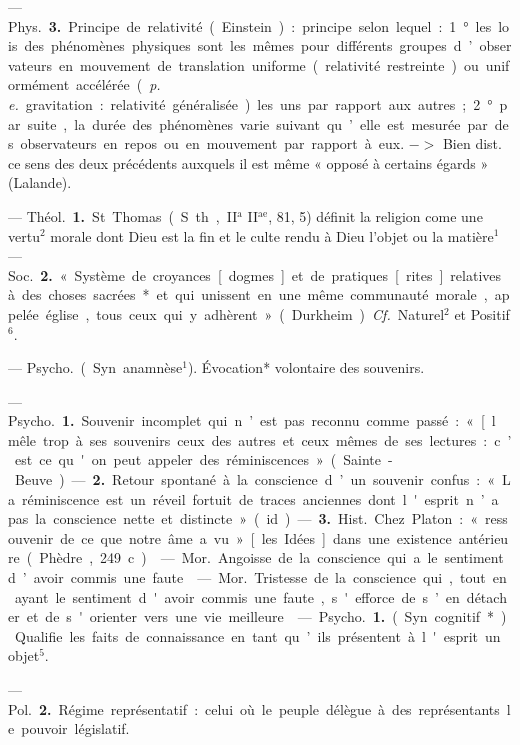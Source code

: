 \begin{itemize}[leftmargin=1cm, label=, itemsep=1pt]
— \si{Phys.} {\bf 3.} Principe de relativité
(Einstein) : principe selon lequel :
1° les lois des phénomènes physiques
sont les mêmes pour différents
groupes d’observateurs en mouvement de translation uniforme (relativité restreinte) ou uniformément
accélérée ({\it p. e.} gravitation : relativité
généralisée) les uns par rapport aux
autres; 2° par suite, la durée des
phénomènes varie suivant qu’elle
est mesurée par des observateurs
en repos ou en mouvement par rapport à eux. $->$ Bien dist. ce sens
des deux précédents auxquels il est
même « opposé à certains égards »
(Lalande).


 — \si{Théol.} {\bf 1.} St. Thomas (S.
th., II$^\text{a}$ II$^\text{ae}$, 81, 5) définit la religion
come une vertu$^2$ morale dont Dieu
est la fin et le culte rendu à Dieu
l’objet ou la matière$^1$ — \si{Soc.} {\bf 2.}
« Système de croyances [dogmes] et
de pratiques [rites] relatives à des
choses sacrées* et qui unissent en
une même communauté morale,
appelée église, tous ceux qui y
adhèrent » (Durkheim). {\it Cf.} Naturel$^2$
et Positif$^6$.

 — \si{Psycho.} (Syn.
anamnèse$^1$). Évocation* volontaire
des souvenirs.

 — \si{Psycho.} {\bf 1.} Souvenir
incomplet qui n’est pas reconnu
comme passé : « [l mêle trop à ses
souvenirs ceux des autres et ceux
mêmes de ses lectures : c’est ce
qu'on peut appeler des réminiscences » (Sainte-Beuve). — {\bf 2.} Retour
spontané à la conscience d’un souvenir confus : « La réminiscence est
un réveil fortuit de traces anciennes
dont l'esprit n’a pas la conscience
nette et distincte » (id.).

— {\bf 3.} \si{Hist.} Chez Platon : « ressouvenir de ce que notre âme a vu »
[les Idées] dans une existence antérieure (Phèdre, 249 c).

 — \si{Mor.} Angoisse de la conscience qui a le sentiment d’avoir
commis une faute.

 — \si{Mor.} Tristesse de la conscience qui, tout en ayant le sentiment d'avoir commis une faute,
s'efforce de s’en détacher et de
s'orienter vers une vie meilleure.

 — \si{Psycho.} {\bf 1.} (Syn.
cognitif*). Qualifie les faits de connaissance en tant qu’ils présentent
à l'esprit un objet$^5$.

— \si{Pol.} {\bf 2.} Régime représentatif :
celui où le peuple délègue à des
représentants le pouvoir législatif.


\end{itemize}
